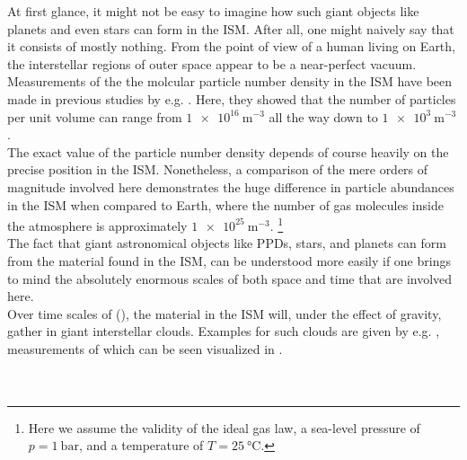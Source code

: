         At first glance, it might not be easy to imagine how such giant objects like planets and 
        even stars can form in the ISM. After all, one might naively say that it consists of mostly
        nothing. From the point of view of a human living on Earth, the interstellar regions of
        outer space appear to be a near-perfect vacuum. \\

        Measurements of the the molcular particle number density in the ISM have been made in 
        previous studies by e.g. \cite{burton_2013}. Here, they showed that the number of particles 
        per unit volume can range from $\SI{1e16}{\meter^{-3}}$ all the way down to 
        $\SI{1e3}{\meter^{-3}}$. \\

        The exact value of the particle number density depends of course heavily on the precise 
        position in the ISM. Nonetheless, a comparison of the mere orders of magnitude involved 
        here demonstrates the huge difference in particle abundances in the ISM when compared to 
        Earth, where the number of gas molecules inside the atmosphere is approximately 
        $\SI{1e25}{\meter^{-3}}$.
        \footnote{Here we assume the validity of the ideal gas law, a sea-level pressure of 
                  $p=\SI{1}{\bar}$, and a temperature of $T=\SI{25}{\celsius}$.}
        \\

        The fact that giant astronomical objects like PPDs, stars, and planets can form from the 
        material found in the ISM, can be understood more easily if one brings to mind the
        absolutely enormous scales of both space and time that are involved here. \\

        Over time scales of (), the material in the ISM 
        will, under the effect of gravity, gather in giant interstellar clouds. Examples for such 
        clouds are given by e.g. , measurements of which can be seen 
        visualized in . \\

         \\
         \\

        

